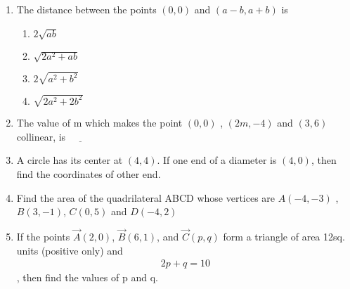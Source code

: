 \begin{enumerate}[label=\thesection.\arabic*.,ref=\thesection.\theenumi]
\item The distance between the points $(0,0)$ and $(a-b, a+b)$ is 
\begin{enumerate}
\item $2{\sqrt{ab}}$
\item $\sqrt{2a^2 + ab}$
\item $ 2\sqrt{a^2 + b^2}$
\item $ \sqrt{2a^2 + 2b^2}$
\end{enumerate}
\item The value of m which makes the point $(0,0)$ , $(2m, -4)$ and $(3,6)$ collinear, is $\underline{\hspace{1cm}}$
\item A circle has its center at $(4,4)$. If one end of a diameter is $(4,0)$, then find the coordinates of other end.
\item  Find the area of the quadrilateral ABCD whose vertices are $A(-4, -3)$ , $B(3, -1)$, $C(0, 5)$ and $D(-4, 2)$
\item If the points $\vec{A}(2,0)$, $\vec{B}(6,1)$, and $\vec{C}(p ,q)$ form a triangle of area 12sq. units (positive only) and \begin{align}2p + q = 10\end{align}, then find the values of p and q.
\end{enumerate}

